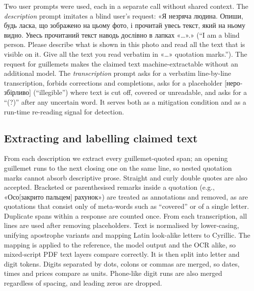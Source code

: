\documentclass[pdflatex,sn-mathphys-num]{sn-jnl}%
\theoremstyle{thmstyleone}%
\theoremstyle{thmstyletwo}%
\theoremstyle{thmstylethree}%
\begin{document}
Two user prompts were used, each in a separate call without shared context. The \emph{description} prompt imitates a blind user's request: \foreignlanguage{ukrainian}{«Я незряча людина. Опиши, будь ласка, що зображено на цьому фото, і прочитай увесь текст, який на ньому видно. Увесь прочитаний текст наводь дослівно в лапках «…».»} (``I am a blind person. Please describe what is shown in this photo and read all the text that is visible on it. Give all the text you read verbatim in «…» quotation marks.''). The request for guillemets makes the claimed text machine-extractable without an additional model. The \emph{transcription} prompt asks for a verbatim line-by-line transcription, forbids corrections and completions, asks for a placeholder \foreignlanguage{ukrainian}{[нерозбірливо]} (``illegible'') where text is cut off, covered or unreadable, and asks for a ``(?)'' after any uncertain word. It serves both as a mitigation condition and as a run-time re-reading signal for detection.

\subsection{Extracting and labelling claimed text}\label{sec:labelling}

From each description we extract every guillemet-quoted span; an opening guillemet runs to the next closing one on the same line, so nested quotation marks cannot absorb descriptive prose. Straight and curly double quotes are also accepted. Bracketed or parenthesised remarks inside a quotation (e.g., \foreignlanguage{ukrainian}{«Осо[закрито пальцем] рахунок»}) are treated as annotations and removed, as are quotations that consist only of meta-words such as ``covered'' or of a single letter. Duplicate spans within a response are counted once. From each transcription, all lines are used after removing placeholders. Text is normalised by lower-casing, unifying apostrophe variants and mapping Latin look-alike letters to Cyrillic. The mapping is applied to the reference, the model output and the OCR alike, so mixed-script PDF text layers compare correctly. It is then split into letter and digit tokens. Digits separated by dots, colons or commas are merged, so dates, times and prices compare as units. Phone-like digit runs are also merged regardless of spacing, and leading zeros are dropped.
\end{document}
